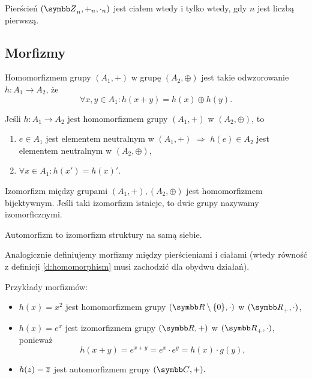 \begin{corollary}
    Pierścień $(\ZZ_n, +_n, \cdot_n)$ jest ciałem wtedy i tylko wtedy, gdy $n$ jest liczbą pierwszą.
\end{corollary}

\subsection{Morfizmy}
\begin{definition}
    \label{d:homomorphism}
    Homomorfizmem grupy $(A_1, +)$ w grupę $(A_2, \oplus)$ jest takie odwzorowanie $h : A_1 \to A_2$, że
    \[ \forall x, y \in A_1 : h(x + y) = h(x) \oplus h(y). \]
\end{definition}

\begin{fact}
    Jeśli $h : A_1 \to A_2$ jest homomorfizmem grupy $(A_1, +)$ w $(A_2, \oplus)$, to
    \begin{enumerate}
        \item $e \in A_1$ jest elementem neutralnym w $(A_1, +)$ $\Longrightarrow$ $h(e) \in A_2$ jest elementem neutralnym w $(A_2, \oplus)$,
        \item $\forall x \in A_1 : h(x') = h(x)'$.
    \end{enumerate}
\end{fact}

\begin{definition}
    Izomorfizm między grupami $(A_1, +), (A_2, \oplus)$ jest homomorfizmem bijektywnym. Jeśli taki izomorfizm istnieje, to dwie grupy nazywamy izomorficznymi.
\end{definition}

\begin{definition}
    Automorfizm to izomorfizm struktury na samą siebie.
\end{definition}

Analogicznie definiujemy morfizmy między pierścieniami i ciałami (wtedy równość z definicji \ref{d:homomorphism} musi zachodzić dla obydwu działań).

\begin{example}
    Przykłady morfizmów:
    \begin{itemize}
        \item $h(x) = x^2$ jest homomorfizmem grupy $(\RR \setminus \{0\}, \cdot)$ w $(\RR_+, \cdot)$,
        \item $h(x) = e^x$ jest izomorfizmem grupy $(\RR, +)$ w $(\RR_+, \cdot)$, ponieważ
        \[ h(x + y) = e^{x + y} = e^x \cdot e^y = h(x) \cdot g(y), \]
        \item $h(z) = \overline{z}$ jest automorfizmem grupy $(\CC, +).$
    \end{itemize}
\end{example}

